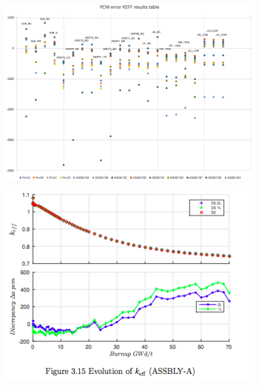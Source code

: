 \documentclass[12pt]{article}
\begin{document}
\begin{figure} [htb!]
\centering
\includegraphics[scale=0.6]{Figures/allData1.png}
\caption{}
\end{figure}

\newpage

\thispagestyle{empty}

\begin{figure} [htb!]
\centering
\includegraphics[scale=1.0]{Figures/Fig 3.15.png}
\end{figure}
\end{document}
